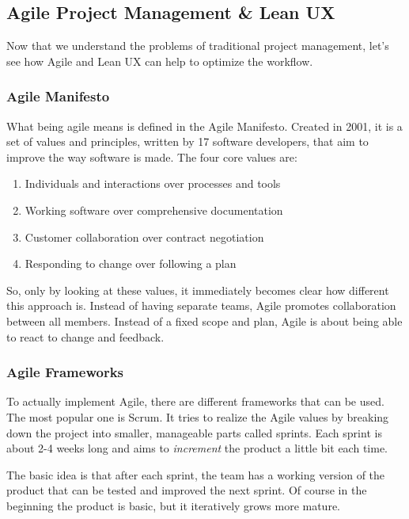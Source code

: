 \subsection{Agile Project Management \& Lean UX}
Now that we understand the problems of traditional project management, let's see how Agile and Lean
UX can help to optimize the workflow.

\subsubsection{Agile Manifesto}

What being agile means is defined in the Agile Manifesto. Created in 2001, it is a set of values and
principles, written by 17 software developers, that aim to improve the way software is made. The
four core values are:
\begin{enumerate}
    \item Individuals and interactions over processes and tools
    \item Working software over comprehensive documentation
    \item Customer collaboration over contract negotiation
    \item Responding to change over following a plan
\end{enumerate}

So, only by looking at these values, it immediately becomes clear how different this approach is.
Instead of having separate teams, Agile promotes collaboration between all members. Instead of a 
fixed scope and plan, Agile is about being able to react to change and feedback. 

\subsubsection{Agile Frameworks}
To actually implement Agile, there are different frameworks that can be used. The most popular one
is Scrum. It tries to realize the Agile values by breaking down the project into smaller, manageable
parts called sprints. Each sprint is about 2-4 weeks long and aims to \textit{increment} the product
a little bit each time. 

The basic idea is that after each sprint, the team has a working version of the product that can be
tested and improved the next sprint. Of course in the beginning the product is basic, but it
iteratively grows more mature. 

